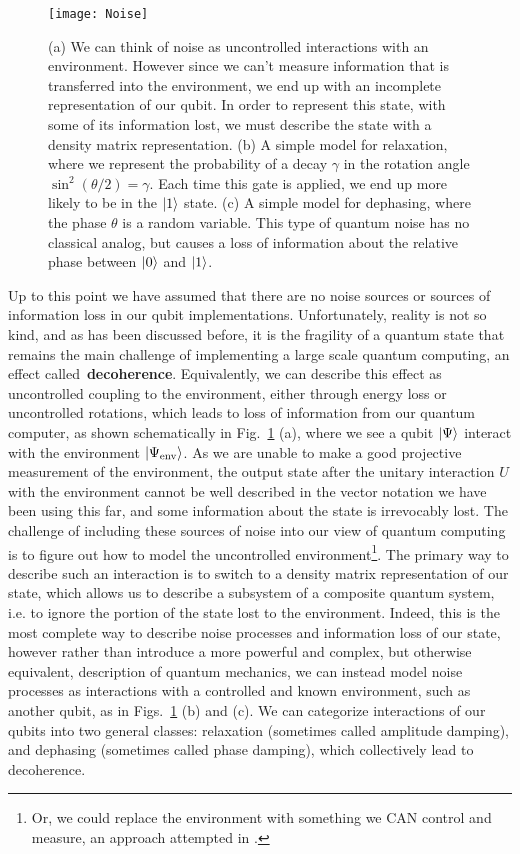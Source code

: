 \begin{figure}
  \texttt{[image: Noise]}
  \caption[Noise affecting pure states]
  {(a) We can think of noise as uncontrolled interactions with an environment. However since we can't measure
  information that is transferred into the environment, we end up with an incomplete representation of our qubit.
  In order to represent this state, with some of its information lost, we must describe the state with a density
  matrix representation. (b) A simple model for relaxation, where we represent the probability of a decay $\gamma$
  in the rotation angle $\sin^2(\theta/2) = \gamma$. Each time this gate is applied, we end up more likely to be in
  the $\ket{1}$ state. (c) A simple model for dephasing, where the phase $\theta$ is a random variable. This type
  of quantum noise has no classical analog, but causes a loss of information about the relative phase between $\ket{0}$
  and $\ket{1}$.}
  \label{fig:noise}
\end{figure}

Up to this point we have assumed that there are no noise sources or sources of information loss in our
qubit implementations. Unfortunately, reality is not so kind, and as has been discussed before, it is the
fragility of a quantum state that remains the main challenge of implementing a large scale quantum computing,
an effect called~\textbf{decoherence}. Equivalently, we can describe this effect as uncontrolled coupling to the environment, either through
energy loss or uncontrolled rotations, which leads to loss of information from our quantum computer, as shown schematically
in Fig.~\ref{fig:noise} (a), where we see a qubit $\ket{\Psi}$ interact with the environment $\ket{\Psi_{\textrm{env}}}$.
As we are unable to make a good projective measurement of the environment, the output
state after the unitary interaction $U$ with the environment cannot be well described in the vector notation we have been using
this far, and some information about the state is irrevocably lost. The challenge of including
these sources of noise into our view of quantum computing is to figure out how to model the uncontrolled
environment\footnote{Or, we could replace the environment with something we CAN control and measure, an approach attempted
in \cite{s41586-019-1287-z}.}.
The primary way to describe such an interaction is to switch to a density matrix representation of our state, which allows us
to describe a subsystem of a composite quantum system, i.e. to ignore the portion of the state lost to the environment.
Indeed, this is the most complete way to describe noise processes and information loss of our state, however rather
than introduce a more powerful and complex, but otherwise equivalent, description of quantum mechanics, we can instead model
noise processes as interactions with a controlled and known environment, such as another qubit, as in Figs.~\ref{fig:noise} (b) and (c).
We can categorize interactions of our qubits into two general classes: relaxation (sometimes called amplitude
damping), and dephasing (sometimes called phase damping), which collectively lead to decoherence.

